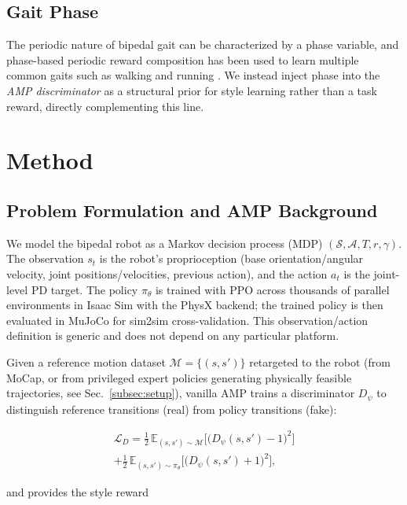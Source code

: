 \documentclass[conference]{IEEEtran}
\begin{document}
\subsection{Gait Phase}
The periodic nature of bipedal gait can be characterized by a phase variable, and phase-based periodic reward composition has been used to learn multiple common gaits such as walking and running \cite{siekmann2021periodic}. We instead inject phase into the \emph{AMP discriminator} as a structural prior for style learning rather than a task reward, directly complementing this line.

\section{Method}
\label{sec:method}

\subsection{Problem Formulation and AMP Background}
\label{subsec:method_prelim}

We model the bipedal robot as a Markov decision process (MDP) $(\mathcal{S},\mathcal{A},T,r,\gamma)$. The observation $s_t$ is the robot's proprioception (base orientation/angular velocity, joint positions/velocities, previous action), and the action $a_t$ is the joint-level PD target. The policy $\pi_\theta$ is trained with PPO \cite{schulman2017ppo} across thousands of parallel environments in Isaac Sim with the PhysX backend; the trained policy is then evaluated in MuJoCo for sim2sim cross-validation. This observation/action definition is generic and does not depend on any particular platform.

Given a reference motion dataset $\mathcal{M}=\{(s,s')\}$ retargeted to the robot (from MoCap, or from privileged expert policies generating physically feasible trajectories, see Sec.~\ref{subsec:setup}), vanilla AMP trains a discriminator $D_\psi$ to distinguish reference transitions (real) from policy transitions (fake):

\begin{multline}
\mathcal{L}_D = \tfrac{1}{2}\,\mathbb{E}_{(s,s')\sim\mathcal{M}}\big[\big(D_\psi(s,s')-1\big)^2\big]
\\
+ \tfrac{1}{2}\,\mathbb{E}_{(s,s')\sim\pi_\theta}\big[\big(D_\psi(s,s')+1\big)^2\big],
\label{eq:amp_disc}
\end{multline}

and provides the style reward
\end{document}
